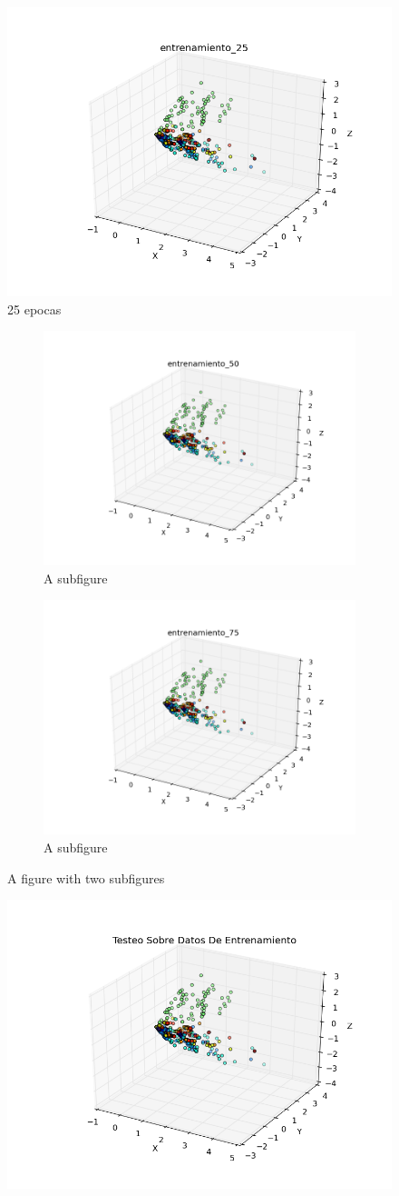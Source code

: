 \begin{figure}[h!]
  \centering
  \includegraphics[width=.6\linewidth]{convergencia_sanger/entrenamiento_25.png}
\caption{25 epocas}
\label{fig:test}
\end{figure}


\begin{figure}[h!]
\centering
\begin{subfigure}{.5\textwidth}
  \centering
  \includegraphics[width=.4\linewidth]{convergencia_sanger/entrenamiento_50.png}
  \caption{A subfigure}
  \label{fig:sub1}
\end{subfigure}%
\begin{subfigure}{.5\textwidth}
  \centering
  \includegraphics[width=.4\linewidth]{convergencia_sanger/entrenamiento_75.png}
  \caption{A subfigure}
  \label{fig:sub2}
\end{subfigure}
\caption{A figure with two subfigures}
\label{fig:test}
\end{figure}

\begin{figure}[h!]
	\centering
	\includegraphics[width=.6\linewidth]{convergencia_sanger/entrenamiento_100.png}
	\label{fig:test1}
	\centering
\end{figure}

